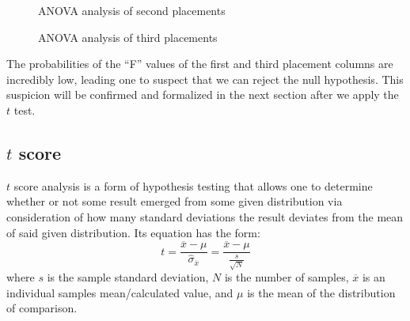 \begin{figure}[H]
\caption{ANOVA analysis of second placements}
\end{figure}

\begin{figure}[H]
\caption{ANOVA analysis of third placements}
\end{figure}

The probabilities of the ``F'' values of the first and third placement columns are
incredibly low, leading one to suspect that we can reject the null hypothesis.
This suspicion will be confirmed and formalized in the next section after we
apply the $t$ test.

\subsection{$t$ score}
$t$ score analysis is a form of hypothesis testing that allows one to determine
whether or not some result emerged from some given distribution via consideration
of how many standard deviations the result deviates from the mean of said given
distribution. Its equation has the form:
$$t =\frac{\overline{x}-\mu}{\hat{\sigma}_{\overline{x}}} = \frac{\overline{x}-\mu}{\frac{s}{\sqrt{N}}}$$
where $s$ is the sample standard deviation, $N$ is the number of samples,
$\overline{x}$ is an individual samples mean/calculated value, and $\mu$ is
the mean of the distribution of comparison.

